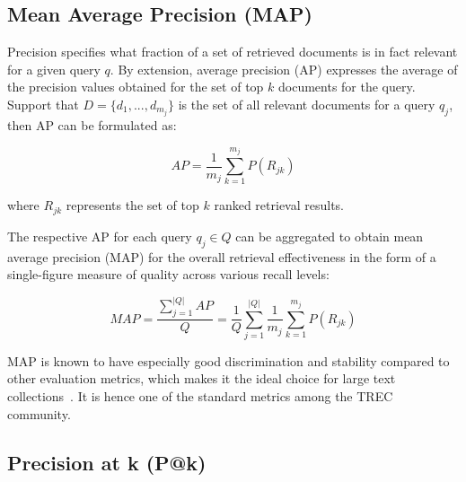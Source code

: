 
\subsection{Mean Average Precision (MAP)}

Precision specifies what fraction of a set of retrieved documents is in fact relevant for a given query $ q $.
By extension, average precision (AP) expresses the average of the precision values obtained for the set of top $ k $ documents for the query.
Support that $ D = \{d_1, ..., d_{m_j}\} $ is the set of all relevant documents for a query $ q_j $, then AP can be formulated as:

\begin{equation}
AP = \frac{1}{m_j} \sum^{m_j} _{k = 1} P(R_{jk})
\end{equation}

where $ R_{jk} $ represents the set of top $ k $ ranked retrieval results.

The respective AP for each query $ q_{j} \in Q $ can be aggregated to obtain mean average precision (MAP) for the overall retrieval effectiveness in the form of a single-figure measure of quality across various recall levels:

\begin{equation}
MAP = \frac{\sum^{|Q|} _{j = 1} AP}{Q} = \frac{1}{Q} \sum^{|Q|} _{j = 1} \frac{1}{m_j} \sum^{m_j} _{k = 1} P(R_{jk})
\end{equation}


MAP is known to have especially good discrimination and stability compared to other evaluation metrics, which makes it the ideal choice for large text collections~\cite{manning2010introduction}.
It is hence one of the standard metrics among the TREC community.

\subsection{Precision at k (P@k)}

